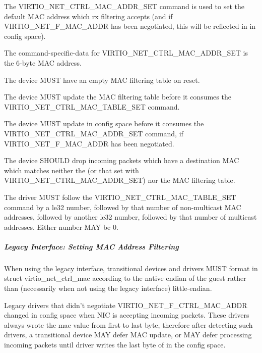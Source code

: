 The VIRTIO_NET_CTRL_MAC_ADDR_SET command is used to set the
default MAC address which rx filtering
accepts (and if VIRTIO_NET_F_MAC_ADDR has been negotiated,
this will be reflected in  in config space).

The command-specific-data for VIRTIO_NET_CTRL_MAC_ADDR_SET is
the 6-byte MAC address.


The device MUST have an empty MAC filtering table on reset.

The device MUST update the MAC filtering table before it consumes
the VIRTIO_NET_CTRL_MAC_TABLE_SET command.

The device MUST update  in config space before it consumes
the VIRTIO_NET_CTRL_MAC_ADDR_SET command, if VIRTIO_NET_F_MAC_ADDR has
been negotiated.

The device SHOULD drop incoming packets which have a destination MAC which
matches neither the  (or that set with VIRTIO_NET_CTRL_MAC_ADDR_SET)
nor the MAC filtering table.


The driver MUST follow the VIRTIO_NET_CTRL_MAC_TABLE_SET command
by a le32 number, followed by that number of non-multicast
MAC addresses, followed by another le32 number, followed by
that number of multicast addresses.  Either number MAY be 0.

\subparagraph{Legacy Interface: Setting MAC Address Filtering}\label{sec:Device Types / Network Device / Device Operation / Control Virtqueue / Setting MAC Address Filtering / Legacy Interface: Setting MAC Address Filtering}
When using the legacy interface, transitional devices and drivers
MUST format  in struct virtio_net_ctrl_mac
according to the native endian of the guest rather than
(necessarily when not using the legacy interface) little-endian.

Legacy drivers that didn't negotiate VIRTIO_NET_F_CTRL_MAC_ADDR
changed  in config space when NIC is accepting
incoming packets. These drivers always wrote the mac value from
first to last byte, therefore after detecting such drivers,
a transitional device MAY defer MAC update, or MAY defer
processing incoming packets until driver writes the last byte
of  in the config space.

